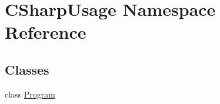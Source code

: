 \hypertarget{namespaceCSharpUsage}{}\section{C\+Sharp\+Usage Namespace Reference}
\label{namespaceCSharpUsage}
\subsection*{Classes}
\begin{DoxyCompactItemize}
\item 
class \mbox{\hyperlink{classCSharpUsage_1_1Program}{Program}}
\end{DoxyCompactItemize}
